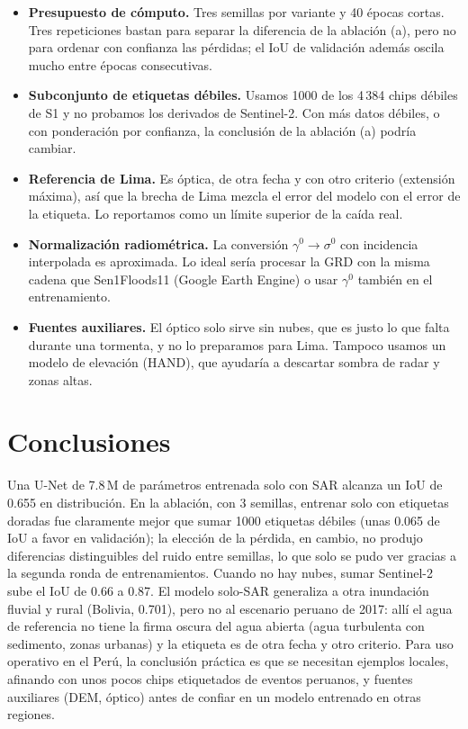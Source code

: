 \documentclass{article}
\begin{document}
\begin{itemize}
  \item \textbf{Presupuesto de cómputo.} Tres semillas por variante y 40 épocas cortas. Tres
  repeticiones bastan para separar la diferencia de la ablación (a), pero no para ordenar con confianza
  las pérdidas; el IoU de validación además oscila mucho entre épocas consecutivas.
  \item \textbf{Subconjunto de etiquetas débiles.} Usamos 1000 de los 4\,384 chips débiles de S1 y no
  probamos los derivados de Sentinel-2. Con más datos débiles, o con ponderación por confianza, la
  conclusión de la ablación (a) podría cambiar.
  \item \textbf{Referencia de Lima.} Es óptica, de otra fecha y con otro criterio (extensión máxima),
  así que la brecha de Lima mezcla el error del modelo con el error de la etiqueta. Lo reportamos como
  un límite superior de la caída real.
  \item \textbf{Normalización radiométrica.} La conversión $\gamma^0\to\sigma^0$ con incidencia
  interpolada es aproximada. Lo ideal sería procesar la GRD con la misma cadena que Sen1Floods11
  (Google Earth Engine) o usar $\gamma^0$ también en el entrenamiento.
  \item \textbf{Fuentes auxiliares.} El óptico solo sirve sin nubes, que es justo lo que falta durante
  una tormenta, y no lo preparamos para Lima. Tampoco usamos un modelo de elevación (HAND), que ayudaría a
  descartar sombra de radar y zonas altas.
\end{itemize}

\section{Conclusiones}

Una U-Net de 7.8\,M de parámetros entrenada solo con SAR alcanza un IoU de 0.655 en distribución. En la
ablación, con 3 semillas, entrenar solo con etiquetas doradas fue claramente mejor que sumar 1000
etiquetas débiles (unas 0.065 de IoU a favor en validación); la elección de la pérdida, en cambio, no
produjo diferencias distinguibles del ruido entre semillas, lo que solo se pudo ver gracias a la segunda
ronda de entrenamientos. Cuando no hay nubes, sumar Sentinel-2 sube el IoU de 0.66 a 0.87. El modelo
solo-SAR generaliza a otra inundación fluvial y rural (Bolivia, 0.701), pero no al escenario peruano de 2017: allí el agua de referencia no tiene la firma oscura del agua
abierta (agua turbulenta con sedimento, zonas urbanas) y la etiqueta es de otra fecha y otro criterio. Para uso operativo en el Perú, la conclusión práctica es
que se necesitan ejemplos locales, afinando con unos pocos chips etiquetados de eventos peruanos,
y fuentes auxiliares (DEM, óptico) antes de confiar en un modelo entrenado en otras regiones.
\end{document}
